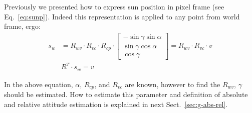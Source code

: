 Previously we presented how to express sun position in pixel frame (see
Eq.~\ref{eq:sunp}). Indeed this representation is applied to any point from
world frame, ergo:
\begin{equation}
  \label{eq:Rwv}
  \begin{split}
    s_{w} & = R_{wv} \cdot R_{vc} \cdot R_{cp} \cdot
    \begin{bmatrix}
    -\sin\gamma \sin\alpha\\
    \sin\gamma \cos\alpha\\
    \cos\gamma
  \end{bmatrix} = R_{wv} \cdot R_{vc} \cdot v\\
    & R^{T} \cdot s_{w}  = v
  \end{split}
\end{equation}

In the above equation, $\alpha$, $R_{cp}$, and $R_{vc}$ are known, however to
find the $R_{wv}$, $\gamma$ should be estimated. How to estimate this parameter
and definition of absolute and relative attitude estimation is explained in
next Sect.~\ref{sec:g-abs-rel}.





